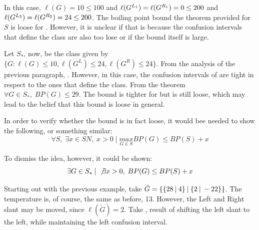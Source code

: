 In this case, $\ell(G) = 10 \leq 100$ and $\ell(\mbox{$G^{L_1}$}) = \ell(\mbox{$G^{R_1}$}) = 0 \leq 200$ and $\ell(\mbox{$G^{L_2}$}) = \ell(\mbox{$G^{R_2}$}) = 24 \leq 200$. The boiling point bound the theorem provided for $S$ is loose for \Gm{}. However, it is unclear if that is because the confusion intervals that define the class are also too lose or if the bound itself is large.

Let $S_*$, now, be the class given by $\{G : \ell(G)\leq10, \ell(G^L)\leq24, \ell(G^R)\leq24\}$. From the analysis of the previous paragraph, . However, in this case, the confusion intervals of \Gm{} are tight in respect to the ones that define the class. From the theorem $\forall G \in S_*,\; BP(G) \leq 29$. The bound is tighter for \Gm{} but is still loose, which may lead to the belief that this bound is loose in general.

In order to verify whether the bound is in fact loose, it would bee needed to show the following, or something similar:
$$
\forall S,\;\exists x\in SN,\; x>0\;|\; \underset{G\in S}{max}BP(G) \leq BP(S) + x
$$

To dismiss the idea, however, it could be shown:
$$
\exists G \in S_*\;|\;\not\exists x>0,\; BP(G)\leq BP(S)+x
$$

Starting out with the previous example, take $\tilde{G} = \mbox{$\{\mbox{$\{28\:|\:4\}$}\:|\:\mbox{$\{2\:|\:-22\}$}\}$}$. The temperature is, of course, the same as before, 13. However, the Left and Right slant may be moved, since $\ell(\tilde{G}) = 2$. Take , result of shifting the left slant to the left, while maintaining the left confusion interval.

